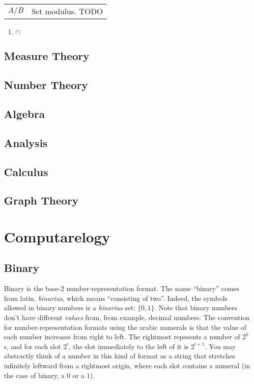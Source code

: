 \documentclass{article}
\begin{document}
\begin{tabular}{c|l}
		$A / B$ &
			Set modulus. TODO \\
	\end{tabular}

	\begin{enumerate}
		\item $\cap$ 
	\end{enumerate}



\subsection{Measure Theory}

\subsection{Number Theory}

\subsection{Algebra}

\subsection{Analysis}

\subsection{Calculus}

\subsection{Graph Theory}

\section{Computarelogy}

\subsection{Binary}

	Binary is the base-2 number-representation format. The name ``binary'' comes from latin, \textit{binarius}, which means ``consisting of two''. Indeed, the symbols allowed in binary numbers is a \textit{binarius} set: $\{ 0, 1 \}$. Note that binary numbers don't have different \textit{values} from, from example, decimal numbers.  The convention for number-representation formats using the arabic numerals is that the value of each number increases from right to left. The rightmost repesents a number of $2^0$s, and for each slot $2^i$, the slot immediately to the left of it is $2^{i+1}$. You may abstractly think of a number in this kind of format as a string that stretches infinitely leftward from a rightmost origin, where each slot contains a numeral (in the case of binary, a $0$ or a $1$).
\end{document}
